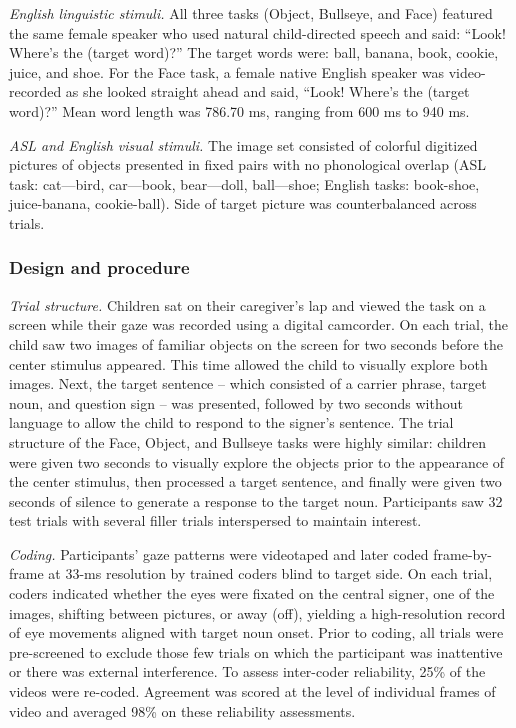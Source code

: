 \documentclass[,man,floatsintext]{apa6}
\begin{document}
\emph{English linguistic stimuli.} All three tasks (Object, Bullseye,
and Face) featured the same female speaker who used natural
child-directed speech and said: \enquote{Look! Where's the (target
word)?} The target words were: ball, banana, book, cookie, juice, and
shoe. For the Face task, a female native English speaker was
video-recorded as she looked straight ahead and said, \enquote{Look!
Where's the (target word)?} Mean word length was 786.70 ms, ranging from
600 ms to 940 ms.

\emph{ASL and English visual stimuli.} The image set consisted of
colorful digitized pictures of objects presented in fixed pairs with no
phonological overlap (ASL task: cat---bird, car---book, bear---doll,
ball---shoe; English tasks: book-shoe, juice-banana, cookie-ball). Side
of target picture was counterbalanced across trials.

\hypertarget{design-and-procedure}{%
\subsubsection{Design and procedure}\label{design-and-procedure}}

\emph{Trial structure.} Children sat on their caregiver's lap and viewed
the task on a screen while their gaze was recorded using a digital
camcorder. On each trial, the child saw two images of familiar objects
on the screen for two seconds before the center stimulus appeared. This
time allowed the child to visually explore both images. Next, the target
sentence -- which consisted of a carrier phrase, target noun, and
question sign -- was presented, followed by two seconds without language
to allow the child to respond to the signer's sentence. The trial
structure of the Face, Object, and Bullseye tasks were highly similar:
children were given two seconds to visually explore the objects prior to
the appearance of the center stimulus, then processed a target sentence,
and finally were given two seconds of silence to generate a response to
the target noun. Participants saw 32 test trials with several filler
trials interspersed to maintain interest.

\emph{Coding.} Participants' gaze patterns were videotaped and later
coded frame-by-frame at 33-ms resolution by trained coders blind to
target side. On each trial, coders indicated whether the eyes were
fixated on the central signer, one of the images, shifting between
pictures, or away (off), yielding a high-resolution record of eye
movements aligned with target noun onset. Prior to coding, all trials
were pre-screened to exclude those few trials on which the participant
was inattentive or there was external interference. To assess
inter-coder reliability, 25\% of the videos were re-coded. Agreement was
scored at the level of individual frames of video and averaged 98\% on
these reliability assessments.
\end{document}
